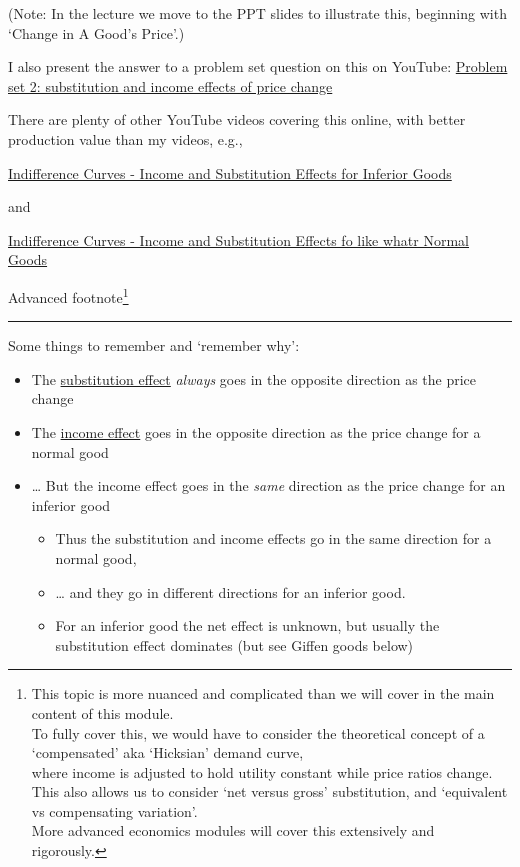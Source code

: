 \documentclass[]{article}
\begin{document}
(Note: In the lecture we move to the PPT slides to illustrate this,
beginning with `Change in A Good's Price'.)

I also present the answer to a problem set question on this on YouTube:
\href{https://youtu.be/D5mqyOnYaAU}{Problem set 2: substitution and
income effects of price change}

There are plenty of other YouTube videos covering this online, with
better production value than my videos, e.g.,

\href{https://www.youtube.com/watch?v=vQsDCo-xVZY}{Indifference Curves -
Income and Substitution Effects for Inferior Goods}

and

\href{https://www.youtube.com/watch?v=vQsDCo-xVZY\&pbjreload=10}{Indifference
Curves - Income and Substitution Effects fo like whatr Normal Goods}

\textcolor{RawSienna}{Advanced footnote}\footnote{This topic is more
  nuanced and complicated than we will cover in the main content of this
  module.\\
  To fully cover this, we would have to consider the theoretical concept
  of a `compensated' aka `Hicksian' demand curve,\\
  where income is adjusted to hold utility constant while price ratios
  change.\\
  This also allows us to consider `net versus gross' substitution, and
  `equivalent vs compensating variation'.\\
  More advanced economics modules will cover this extensively and
  rigorously.}

\begin{center}\rule{0.5\linewidth}{\linethickness}\end{center}

Some things to remember and `remember why':

\begin{itemize}
\item
  The \underline{substitution effect} \emph{always} goes in the opposite
  direction as the price change
\item
  The \underline{income effect} goes in the opposite direction as the
  price change for a normal good
\item
  \ldots{} But the income effect goes in the \emph{same} direction as
  the price change for an inferior good

  \begin{itemize}
  \item
    Thus the substitution and income effects go in the same direction
    for a normal good,
  \item
    \ldots{} and they go in different directions for an inferior good.
  \item
    For an inferior good the net effect is unknown, but usually the
    substitution effect dominates (but see Giffen goods below)
  \end{itemize}
\end{itemize}
\end{document}
